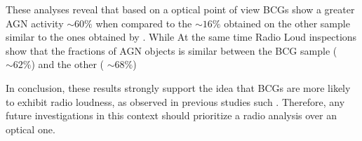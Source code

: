 These analyses reveal that based on a optical point of view BCGs show a greater AGN activity $\sim 60 \%$ when compared to the $\sim 16\%$ obtained on the other sample similar to the ones obtained by \cite{2012A&A...546A..17V}.
While At the same time Radio Loud inspections show that the fractions of AGN objects is similar between the BCG sample ($\sim 62 \%$) and the other ( $\sim 68\%$)

In conclusion, these results strongly support the idea that BCGs are more likely to exhibit radio loudness, as observed in previous studies such \cite{2016MNRAS.460.3669Y, 2014MNRAS.440..762O}. Therefore, any future investigations in this context should prioritize a radio analysis over an optical one.



